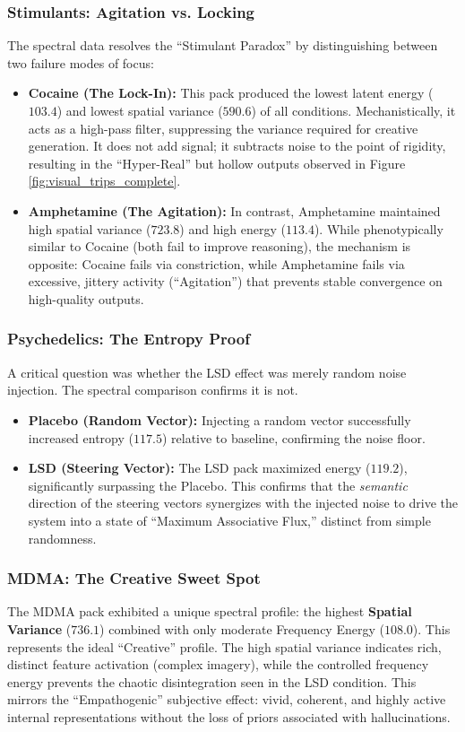 \documentclass[10pt]{article}
\begin{document}
\subsubsection{Stimulants: Agitation vs. Locking}
The spectral data resolves the ``Stimulant Paradox'' by distinguishing between two failure modes of focus:
\begin{itemize}
    \item \textbf{Cocaine (The Lock-In):} This pack produced the lowest latent energy ($103.4$) and lowest spatial variance ($590.6$) of all conditions. Mechanistically, it acts as a high-pass filter, suppressing the variance required for creative generation. It does not add signal; it subtracts noise to the point of rigidity, resulting in the ``Hyper-Real'' but hollow outputs observed in Figure \ref{fig:visual_trips_complete}.
    \item \textbf{Amphetamine (The Agitation):} In contrast, Amphetamine maintained high spatial variance ($723.8$) and high energy ($113.4$). While phenotypically similar to Cocaine (both fail to improve reasoning), the mechanism is opposite: Cocaine fails via constriction, while Amphetamine fails via excessive, jittery activity (``Agitation'') that prevents stable convergence on high-quality outputs.
\end{itemize}

\subsubsection{Psychedelics: The Entropy Proof}
A critical question was whether the LSD effect was merely random noise injection. The spectral comparison confirms it is not.
\begin{itemize}
    \item \textbf{Placebo (Random Vector):} Injecting a random vector successfully increased entropy ($117.5$) relative to baseline, confirming the noise floor.
    \item \textbf{LSD (Steering Vector):} The LSD pack maximized energy ($119.2$), significantly surpassing the Placebo. This confirms that the \textit{semantic} direction of the steering vectors synergizes with the injected noise to drive the system into a state of ``Maximum Associative Flux,'' distinct from simple randomness.
\end{itemize}

\subsubsection{MDMA: The Creative Sweet Spot}
The MDMA pack exhibited a unique spectral profile: the highest \textbf{Spatial Variance} ($736.1$) combined with only moderate Frequency Energy ($108.0$).
This represents the ideal ``Creative'' profile. The high spatial variance indicates rich, distinct feature activation (complex imagery), while the controlled frequency energy prevents the chaotic disintegration seen in the LSD condition. This mirrors the ``Empathogenic'' subjective effect: vivid, coherent, and highly active internal representations without the loss of priors associated with hallucinations.
\end{document}
